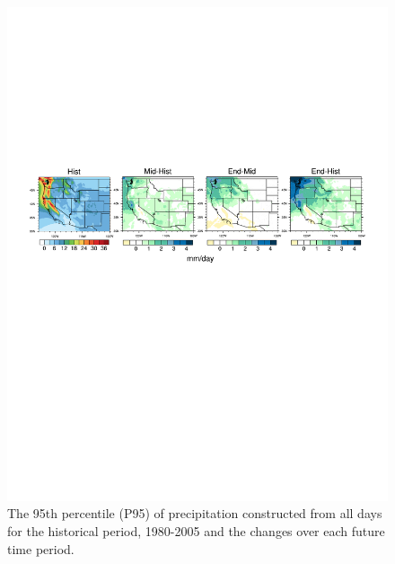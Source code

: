\documentclass{ametsoc}
\begin{document}
\begin{figure}
\begin{center}
\includegraphics[width=6in]{extreme_percentile.pdf}
\caption{The 95th percentile (P95) of precipitation constructed from all days for the historical period, 1980-2005 and the changes over each future time period.}
\label{fig:prQtile}
\end{center}
\end{figure}
\end{document}
